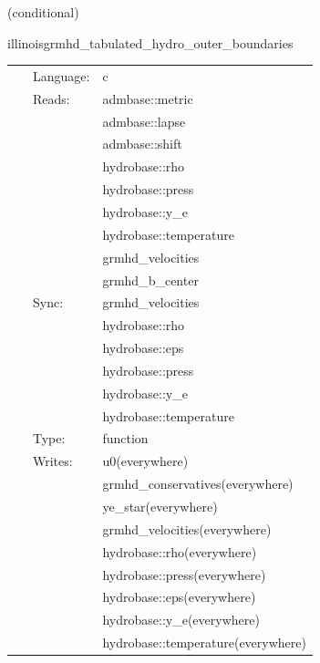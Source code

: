 \documentclass{article}
\begin{document}
   (conditional) 

\hspace{5mm} illinoisgrmhd\_tabulated\_hydro\_outer\_boundaries 

\hspace{5mm}{\it tabulated version of illinoisgrmhd\_outer\_boundaries } 


\hspace{5mm}

 \begin{tabular*}{160mm}{cll} 
~ & Language:  & c \\ 
~ & Reads:  & admbase::metric \\ 
~& ~ &admbase::lapse\\ 
~& ~ &admbase::shift\\ 
~& ~ &hydrobase::rho\\ 
~& ~ &hydrobase::press\\ 
~& ~ &hydrobase::y\_e\\ 
~& ~ &hydrobase::temperature\\ 
~& ~ &grmhd\_velocities\\ 
~& ~ &grmhd\_b\_center\\ 
~ & Sync:  & grmhd\_velocities \\ 
~& ~ &hydrobase::rho\\ 
~& ~ &hydrobase::eps\\ 
~& ~ &hydrobase::press\\ 
~& ~ &hydrobase::y\_e\\ 
~& ~ &hydrobase::temperature\\ 
~ & Type:  & function \\ 
~ & Writes:  & u0(everywhere) \\ 
~& ~ &grmhd\_conservatives(everywhere)\\ 
~& ~ &ye\_star(everywhere)\\ 
~& ~ &grmhd\_velocities(everywhere)\\ 
~& ~ &hydrobase::rho(everywhere)\\ 
~& ~ &hydrobase::press(everywhere)\\ 
~& ~ &hydrobase::eps(everywhere)\\ 
~& ~ &hydrobase::y\_e(everywhere)\\ 
~& ~ &hydrobase::temperature(everywhere)\\ 
\end{tabular*} 


\vspace{5mm}
\end{document}
